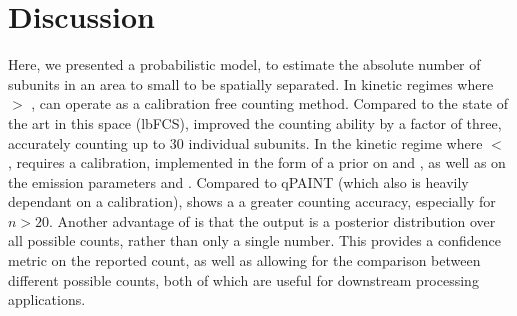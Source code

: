 \section{Discussion}
Here, we presented \ours a probabilistic model, to estimate the absolute number of subunits in an area to small to be spatially separated. 
    In kinetic regimes where \pon $>$ \poff, \ours can operate as a calibration free counting method.
    Compared to the state of the art in this space (lbFCS), \ours improved the counting ability by a factor of three,
    accurately counting up to 30 individual subunits.
    In the kinetic regime where \pon $<$ \poff, \ours requires a calibration, implemented in the form of a prior on \pon and \poff,
    as well as on the emission parameters \re and \rb.
    Compared to qPAINT (which also is heavily dependant on a calibration), \ours shows a a greater counting accuracy, especially for $n > 20$.
    Another advantage of \ours is that the output is a posterior distribution over all possible counts, rather than only a single number. 
    This provides a confidence metric on the reported count, as well as allowing for the comparison between different possible counts, 
    both of which are useful for downstream processing applications. 

